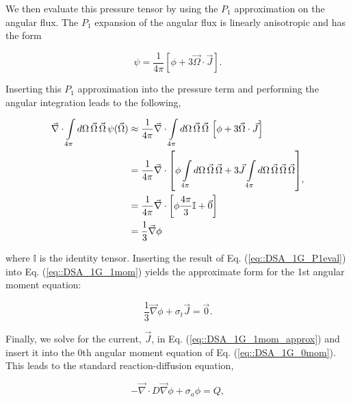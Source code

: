 \noindent We then evaluate this pressure tensor by using the $P_1$ approximation on the angular flux. The $P_1$ expansion of the angular flux is linearly anisotropic and has the form

\begin{equation}
\label{eq::DSA_1G_P1approx}
\psi = \frac{1}{4 \pi} \left[ \phi + 3 \vec{\Omega} \cdot \vec{J}  \right].
\end{equation}

\noindent Inserting this $P_1$ approximation into the pressure term and performing the angular integration leads to the following,

\begin{equation}
\label{eq::DSA_1G_P1eval}
\begin{aligned}
\vec{\nabla} \cdot  \int\displaylimits_{4 \pi}  d \Omega \, \vec{\Omega}\, \vec{\Omega} \, \psi (\vec{\Omega}) &\approx \frac{1}{4 \pi} \vec{\nabla} \cdot \int\displaylimits_{4 \pi}  d \Omega \, \vec{\Omega}\, \vec{\Omega} \, \left[ \phi + 3 \vec{\Omega} \cdot \vec{J} \right] \\
&= \frac{1}{4 \pi} \vec{\nabla} \cdot \left[  \phi  \int\displaylimits_{4 \pi}  d \Omega \, \vec{\Omega}\, \vec{\Omega}    + 3 \vec{J}  \int\displaylimits_{4 \pi}  d \Omega \, \vec{\Omega}\, \vec{\Omega} \, \vec{\Omega}   \right] \\
&= \frac{1}{4 \pi} \vec{\nabla} \cdot \left[ \phi  \frac{4 \pi}{3} \mathbb{I} + \vec{0} \right] \\
&= \frac{1}{3} \vec{\nabla} \phi
\end{aligned} ,
\end{equation}

\noindent where $\mathbb{I}$ is the identity tensor. Inserting the result of Eq. (\ref{eq::DSA_1G_P1eval}) into Eq. (\ref{eq::DSA_1G_1mom}) yields the approximate form for the 1st angular moment equation:

\begin{equation}
\label{eq::DSA_1G_1mom_approx}
\frac{1}{3} \vec{\nabla} \phi+ \sigma_t \vec{J} = \vec{0} .
\end{equation}

\noindent Finally, we solve for the current, $\vec{J}$, in Eq. (\ref{eq::DSA_1G_1mom_approx}) and insert it into the 0th angular moment equation of Eq. (\ref{eq::DSA_1G_0mom}). This leads to the standard reaction-diffusion equation,

\begin{equation}
\label{eq::DSA_1G_diffeq_FINAL}
-\vec{\nabla} \cdot D \vec{\nabla} \phi + \sigma_a \phi =  Q ,
\end{equation}

